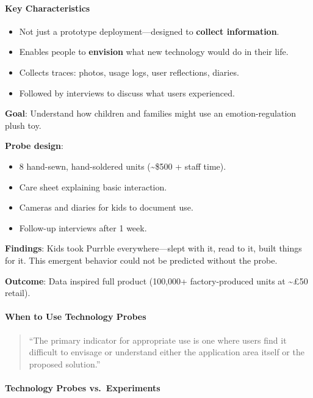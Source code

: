 \paragraph*{Key Characteristics}
\begin{itemize}
  \item Not just a prototype deployment---designed to \textbf{collect information}.
  \item Enables people to \textbf{envision} what new technology would do in their life.
  \item Collects traces: photos, usage logs, user reflections, diaries.
  \item Followed by interviews to discuss what users experienced.
\end{itemize}

\begin{exbox}
\textbf{Goal}: Understand how children and families might use an emotion-regulation plush toy.

\textbf{Probe design}:
\begin{itemize}
  \item 8 hand-sewn, hand-soldered units (\textasciitilde\$500 + staff time).
  \item Care sheet explaining basic interaction.
  \item Cameras and diaries for kids to document use.
  \item Follow-up interviews after 1 week.
\end{itemize}

\textbf{Findings}: Kids took Purrble everywhere---slept with it, read to it, built things for it. This emergent behavior could not be predicted without the probe.

\textbf{Outcome}: Data inspired full product (100,000+ factory-produced units at \textasciitilde\pounds50 retail).
\end{exbox}

\paragraph*{When to Use Technology Probes}
\begin{quote}
``The primary indicator for appropriate use is one where users find it difficult to envisage or understand either the application area itself or the proposed solution.''
\end{quote}

\paragraph*{Technology Probes vs.\ Experiments}

